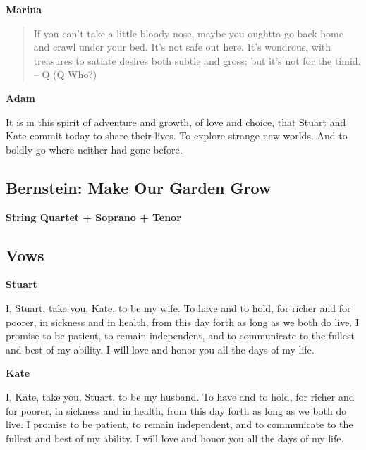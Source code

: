 \documentclass[twoside]{article}
\begin{document}
        \begin{center}
          \textbf{Marina}
        \end{center}
        \begin{quote} 
          If you can't take a little bloody nose, maybe you oughtta go back home and crawl under your bed. It's not safe out here. It's wondrous, with treasures to satiate desires both subtle and gross; but it's not for the timid.
          -- Q (Q Who?)
        \end{quote}

        \begin{center}
          \textbf{Adam}
        \end{center}

It is in this spirit of adventure and growth, of love and choice, that Stuart and Kate commit today to share their lives. To explore strange new worlds. And to boldly go where neither had gone before.

      \subsection{Bernstein: Make Our Garden Grow}
        \begin{center}
         \textbf{String Quartet + Soprano + Tenor}
        \end{center}

  	   \subsection{Vows}
         \begin{center}
           \textbf{Stuart}
         \end{center}
          
I, Stuart, take you, Kate, to be my wife. To have and to hold, for richer and for poorer, in sickness and in health, from this day forth as long as we both do live. I promise to be patient, to remain independent, and to communicate to the fullest and best of my ability. I will love and honor you all the days of my life.
	
          \begin{center}
           \textbf{Kate}
          \end{center}
          
I, Kate, take you, Stuart, to be my husband. To have and to hold, for richer and for poorer, in sickness and in health, from this day forth as long as we both do live. I promise to be patient, to remain independent, and to communicate to the fullest and best of my ability. I will love and honor you all the days of my life.
\end{document}

